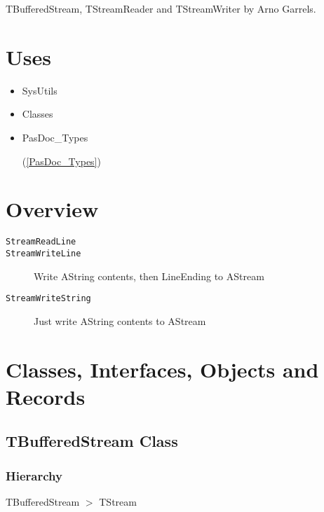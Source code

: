 \documentclass{report}
\newif\ifpdf
\begin{document}
   TBufferedStream, TStreamReader and TStreamWriter by Arno Garrels.
\section{Uses}
\begin{itemize}
\item \begin{ttfamily}SysUtils\end{ttfamily}\item \begin{ttfamily}Classes\end{ttfamily}\item \begin{ttfamily}PasDoc{\_}Types\end{ttfamily}(\ref{PasDoc_Types})\end{itemize}
\section{Overview}
\begin{description}
\item[\texttt{\begin{ttfamily}TBufferedStream\end{ttfamily} Class}]
\end{description}
\begin{description}
\item[\texttt{StreamReadLine}]
\item[\texttt{StreamWriteLine}]Write AString contents, then LineEnding to AStream
\item[\texttt{StreamWriteString}]Just write AString contents to AStream
\end{description}
\section{Classes, Interfaces, Objects and Records}
\ifpdf
\subsection*{\large{\textbf{TBufferedStream Class}}\normalsize\hspace{1ex}\hrulefill}
\else
\subsection*{TBufferedStream Class}
\fi
\label{PasDoc_StreamUtils.TBufferedStream}
\subsubsection*{\large{\textbf{Hierarchy}}\normalsize\hspace{1ex}\hfill}
TBufferedStream {$>$} TStream
\end{document}
